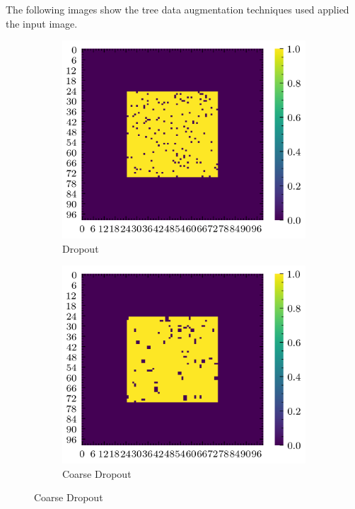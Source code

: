 \documentclass[../document.tex]{subfiles}
\begin{document}
The following images show the tree data augmentation techniques used applied the input image.
\begin{figure}[H]
    \centering
        \begin{subfigure}[b]{0.32\textwidth}
            \includegraphics[width=\textwidth]{../img/data-aug/2d/center-dropout.png}
            \caption{Dropout}
        \end{subfigure}
        \begin{subfigure}[b]{0.32\linewidth}
            \includegraphics[width=\textwidth]{../img/data-aug/2d/center-coarse-dropout.png}
            \caption{Coarse Dropout}
            \end{subfigure}    


\end{figure}
\end{document}

